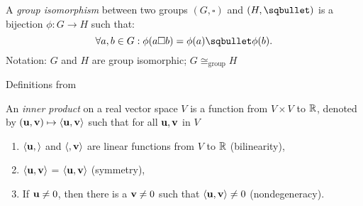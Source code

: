 \begin{definition}
    A \emph{group isomorphism} between two groups \((G, \square)\) and \((H, \sqbullet)\) is a bijection \(\phi: G \to H\) such that:
    \[ \forall a, b \in G: \phi(a\square b) = \phi(a) \sqbullet \phi(b).\]
    Notation: \(G\) and \(H\) are group isomorphic; \(G \cong_\text{group} H\)
\end{definition}


Definitions from \cite{Lee2000}

\begin{definition}
    An \emph{inner product} on a real vector space $V$ is a function from $V \times V$ to $\mathbb{R}$, denoted by $(\vb{u}, \vb{v}) \mapsto \langle \vb{u}, \vb{v} \rangle$ such that for all $\vb{u}, \vb{v}$ in $V$
    \begin{enumerate}
        \item $\langle \vb{u}, \rangle$ and $\langle, \vb{v}\rangle$ are linear functions from $V$ to $\mathbb{R}$ (bilinearity),
        \item $\langle \vb{u}, \vb{v} \rangle$ = $\langle \vb{u}, \vb{v} \rangle$ (symmetry),
        \item If $\vb{u} \neq 0$, then there is a $\vb{v} \neq 0$ such that $\langle \vb{u}, \vb{v} \rangle \neq 0$ (nondegeneracy).
    \end{enumerate}
    
\end{definition}


